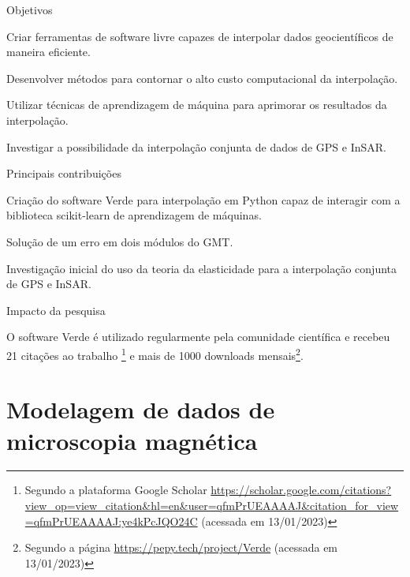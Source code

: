 \documentclass[12pt,a4paper,oneside]{book}
\begin{document}
\begin{fancyenum}{\faBullseye}{Objetivos}
  \item Criar ferramentas de software livre capazes de interpolar dados
    geocientíficos de maneira eficiente.
  \item Desenvolver métodos para contornar o alto custo computacional da
    interpolação.
  \item Utilizar técnicas de aprendizagem de máquina para aprimorar os
    resultados da interpolação.
  \item Investigar a possibilidade da interpolação conjunta de dados de GPS e
    InSAR.
\end{fancyenum}
\begin{fancyenum}{\faLightbulb}{Principais contribuições}
  \item Criação do software Verde para interpolação em Python capaz de
    interagir com a biblioteca scikit-learn de aprendizagem de máquinas.
  \item Solução de um erro em dois módulos do GMT.
  \item Investigação inicial do uso da teoria da elasticidade para a
    interpolação conjunta de GPS e InSAR.
\end{fancyenum}
\begin{fancyenum}{\faRocket}{Impacto da pesquisa}
  \item O software Verde é utilizado regularmente pela comunidade científica
    e recebeu 21 citações ao trabalho \citet{Uieda2018}\footnote{Segundo a plataforma Google Scholar \url{https://scholar.google.com/citations?view_op=view_citation&hl=en&user=qfmPrUEAAAAJ&citation_for_view=qfmPrUEAAAAJ:ye4kPcJQO24C} (acessada em 13/01/2023)}
    e mais de 1000 downloads mensais\footnote{Segundo a página
    \url{https://pepy.tech/project/Verde} (acessada em 13/01/2023)}.
\end{fancyenum}


\section{Modelagem de dados de microscopia magnética}
\label{sec_micromag}
\end{document}
